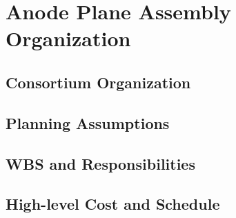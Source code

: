 \chapter{Anode Plane Assembly Organization}
\label{ch:fdsp-apa-org}

\section{Consortium Organization}
\label{sec:fdsp-apa-org-consortium}


\section{Planning Assumptions}
\label{sec:fdsp-apa-org-assmp}


\section{WBS and Responsibilities}
\label{sec:fdsp-apa-org-wbs}

\section{High-level Cost and Schedule}
\label{sec:fdsp-apa-org-cs}





